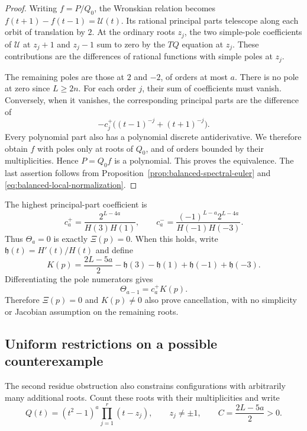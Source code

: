 \documentclass[11pt]{article}
\theoremstyle{definition}
\begin{document}
\begin{proof}
Writing $f=P/Q_0$, the Wronskian relation becomes
$f(t+1)-f(t-1)=\mathcal U(t)$. Its rational principal parts telescope
along each orbit of translation by $2$. At the ordinary roots $z_j$,
the two simple-pole coefficients of $\mathcal U$ at $z_j+1$ and
$z_j-1$ sum to zero by the $TQ$ equation at $z_j$.
These contributions are the differences of rational functions with
simple poles at $z_j$.

The remaining poles are those at $2$ and $-2$, of orders at most $a$.
There is no pole at zero since $L\ge2n$. For each order $j$, their
sum of coefficients must vanish. Conversely, when it vanishes, the
corresponding principal parts are the difference of
\[
 -c_j^+\bigl((t-1)^{-j}+(t+1)^{-j}\bigr).
\]
Every polynomial part also has a polynomial discrete antiderivative.
We therefore obtain $f$ with poles only at roots of $Q_0$, and of
orders bounded by their multiplicities. Hence $P=Q_0f$ is a
polynomial. This proves the equivalence. The last assertion follows
from Proposition~\ref{prop:balanced-spectral-euler} and
\eqref{eq:balanced-local-normalization}.
\end{proof}

The highest principal-part coefficient is
\[
 c_a^+=\frac{2^{L-4a}}{H(3)H(1)},\qquad
 c_a^-=\frac{(-1)^{L-a}2^{L-4a}}{H(-1)H(-3)}.
\]
Thus $\Theta_a=0$ is exactly $\Xi(p)=0$. When this holds, write
$\mathfrak h(t)=H'(t)/H(t)$ and define
\begin{equation}\label{eq:balanced-second-obstruction}
 K(p)=\frac{2L-5a}{2}-\mathfrak h(3)-\mathfrak h(1)
                         +\mathfrak h(-1)+\mathfrak h(-3).
\end{equation}
Differentiating the pole numerators gives
\[
 \Theta_{a-1}=c_a^+K(p).
\]
Therefore $\Xi(p)=0$ and $K(p)\ne0$ also prove cancellation, with
no simplicity or Jacobian assumption on the remaining roots.

\subsection{Uniform restrictions on a possible counterexample}

The second residue obstruction also constrains configurations with
arbitrarily many additional roots. Count these roots with their
multiplicities and write
\[
 Q(t)=(t^2-1)^a\prod_{j=1}^r(t-z_j),\qquad
 z_j\ne\pm1,\qquad C=\frac{2L-5a}{2}>0.
\]
\end{document}
